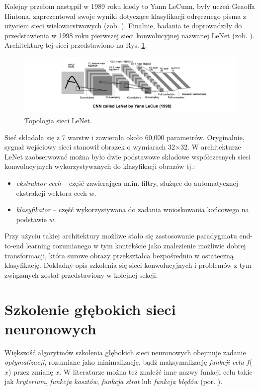 Kolejny przełom nastąpił w 1989 roku kiedy to Yann LeCunn, były uczeń Geaoffa Hintona, zaprezentował swoje wyniki dotyczące klasyfikacji odręcznego pisma z użyciem sieci wielowarstwowych (zob. \cite{NIPS1989_293}). Finalnie, badania te doprowadziły do przedstawienia w 1998 roku pierwszej sieci konwolucyjnej nazwanej LeNet (zob. \cite{Lecun1998}). Architekturę tej sieci przedstawiono na Rys. \ref{LeNet}.
\begin{figure}[h!]
	\centering
	\includegraphics[width=1\textwidth]{figures/lenet.png}
	\caption{Topologia sieci LeNet.}
	\label{LeNet}
\end{figure}

Sieć składała się z 7 warstw i zawierała około 60,000 parametrów. Oryginalnie, sygnał wejściowy sieci stanowił obrazek o wymiarach 32$\times$32. W architekturze LeNet zaobserwować można było dwie podstawowe składowe współczesnych sieci konwolucyjnych wykorzystywanych do klasyfikacji obrazów tj.:
\begin{itemize}
	\item \textit{ekstraktor cech} -- część zawierająca m.in. filtry, służące do automatycznej ekstrakcji wektora cech $w$.
	\item \textit{klasyfikator} -- część wykorzystywana do zadania wnioskowania końcowego na podstawie $w$.
\end{itemize}  

Przy użyciu takiej architektury możliwe stało się zastosowanie paradygmatu end-to-end learning rozumianego w tym kontekście jako znalezienie możliwie dobrej transformacji, która surowe obrazy przekształca bezpośrednio w ostateczną klasyfikację. Dokładny opis szkolenia się sieci konwolucyjnych i problemów z tym związanych został przedstawiony w kolejnej sekcji.  

\section{Szkolenie głębokich sieci neuronowych}

Większość algorytmów szkolenia głębokich sieci neuronowych obejmuje zadanie \textit{optymalizacji}, rozumiane jako minimalizację, bądź maksymalizację \textit{funkcji celu} $f$($x$) przez zmianę $x$. W literaturze można też znaleźć inne nazwy funkcji celu takie jak \textit{kryterium}, \textit{funkcja kosztów}, \textit{funkcja strat} lub \textit{funkcja błędów} (por. \cite{Goodfellow-et-al-2016}). 

